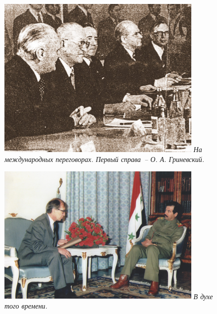 \begin{figure}[ht!]
    \begin{minipage}{100mm}
        \includegraphics[width=100mm]{inc/77/2}
        \footnotesize{\textit{На международных переговорах. Первый справа~-- О. А. Гриневский.}}
     \end{minipage}
\end{figure}

\vspace{10pt}

\begin{figure}[h!]
\begin{minipage}{100mm}
    \includegraphics[width=100mm]{inc/77/3}
    \footnotesize{\textit{В духе того времени.}}
\end{minipage}
\end{figure}

